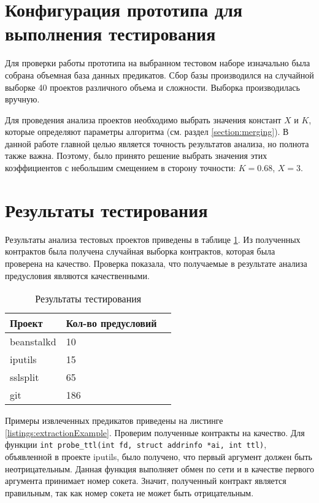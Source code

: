 \section{Конфигурация прототипа для выполнения тестирования}
Для проверки работы прототипа на выбранном тестовом наборе изначально была собрана объемная база данных предикатов. Сбор базы производился на случайной выборке 40 проектов различного объема и сложности. Выборка производилась вручную.

Для проведения анализа проектов необходимо выбрать значения констант $X$ и $K$, которые определяют параметры алгоритма (см. раздел \ref{section:merging}). В данной работе главной целью является точность результатов анализа, но полнота также важна. Поэтому, было принято решение выбрать значения этих коэффициентов с небольшим смещением в сторону точности: $K=0.68$, $X=3$.

\section{Результаты тестирования}
Результаты анализа тестовых проектов приведены в таблице \ref{table:testing}. Из полученных контрактов была получена случайная выборка контрактов, которая была проверена на качество. Проверка показала, что получаемые в результате анализа предусловия являются качественными.

\begin{table}
	\caption{Результаты тестирования}
	\begin{center}
	\begin{tabular}{|l|l|l|}
	\hline 
	\textbf{Проект} & \textbf{Кол-во предусловий}	\\ 
	\hline 
	beanstalkd & 10 \\ 
	\hline 
	iputils & 15  \\ 
	\hline 
	sslsplit & 65 \\
	\hline 
	git & 186 \\ 
	\hline 
	\end{tabular} 
	\end{center}
	\label{table:testing}
\end{table}

Примеры извлеченных предикатов приведены на листинге \ref{listings:extractionExample}. Проверим полученные контракты на качество. Для функции \texttt{int probe_ttl(int fd, struct addrinfo *ai, int ttl)}, объявленной в проекте iputils, было получено, что первый аргумент должен быть неотрицательным. Данная функция выполняет обмен по сети и в качестве первого аргумента принимает номер сокета. Значит, полученный контракт является правильным, так как номер сокета не может быть отрицательным.

